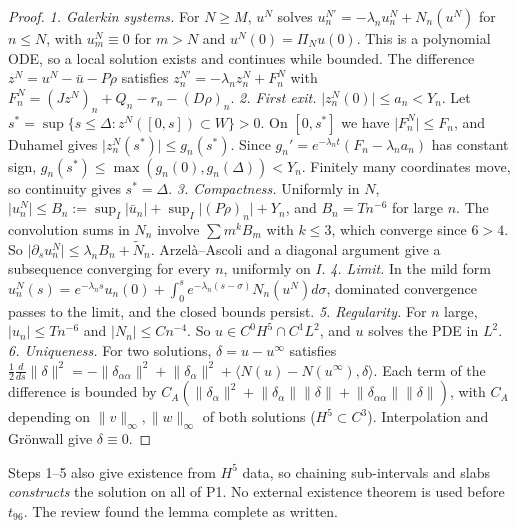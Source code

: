 \documentclass[11pt]{article}
\theoremstyle{definition}
\theoremstyle{remark}
\newcommand{\ip}[2]{\langle #1,#2\rangle}
\newcommand{\abs}[1]{\lvert #1\rvert}
\newcommand{\norm}[1]{\lVert #1\rVert}
\begin{document}
\begin{proof}
\emph{1. Galerkin systems.} For $N\ge M$, $u^N$ solves $u^{N\prime}_n=-\lambda_nu^N_n+N_n(u^N)$ for $n\le N$, with $u^N_m\equiv0$ for $m>N$ and $u^N(0)=\Pi_Nu(0)$. This is a polynomial ODE, so a local solution exists and continues while bounded. The difference $z^N=u^N-\bar u-P\rho$ satisfies $z^{N\prime}_n=-\lambda_nz^N_n+F^N_n$ with $F^N_n=(Jz^N)_n+Q_n-r_n-(D\rho)_n$.
\emph{2. First exit.} $\abs{z_n^N(0)}\le a_n<Y_n$. Let $s^*=\sup\{s\le\Delta:z^N([0,s])\subset W\}>0$. On $[0,s^*]$ we have $\abs{F_n^N}\le F_n$, and Duhamel gives $\abs{z^N_n(s^*)}\le g_n(s^*)$. Since $g_n'=e^{-\lambda_nt}(F_n-\lambda_na_n)$ has constant sign, $g_n(s^*)\le\max(g_n(0),g_n(\Delta))<Y_n$. Finitely many coordinates move, so continuity gives $s^*=\Delta$.
\emph{3. Compactness.} Uniformly in $N$, $\abs{u^N_n}\le B_n:=\sup_I\abs{\bar u_n}+\sup_I\abs{(P\rho)_n}+Y_n$, and $B_n=Tn^{-6}$ for large $n$. The convolution sums in $N_n$ involve $\sum m^kB_m$ with $k\le3$, which converge since $6>4$. So $\abs{\partial_su^N_n}\le\lambda_nB_n+\tilde N_n$. Arzel\`a--Ascoli and a diagonal argument give a subsequence converging for every $n$, uniformly on $I$.
\emph{4. Limit.} In the mild form $u_n^N(s)=e^{-\lambda_ns}u_n(0)+\int_0^se^{-\lambda_n(s-\sigma)}N_n(u^N)d\sigma$, dominated convergence passes to the limit, and the closed bounds persist.
\emph{5. Regularity.} For $n$ large, $\abs{u_n}\le Tn^{-6}$ and $\abs{N_n}\le Cn^{-4}$. So $u\in C^0H^5\cap C^1L^2$, and $u$ solves the PDE in $L^2$.
\emph{6. Uniqueness.} For two solutions, $\delta=u-u^\infty$ satisfies $\frac12\frac d{ds}\norm\delta^2=-\norm{\delta_{\alpha\alpha}}^2+\norm{\delta_\alpha}^2+\ip{N(u)-N(u^\infty)}\delta$. Each term of the difference is bounded by $C_A(\norm{\delta_\alpha}^2+\norm{\delta_\alpha}\norm\delta+\norm{\delta_{\alpha\alpha}}\norm\delta)$, with $C_A$ depending on $\norm{v}_\infty,\norm w_\infty$ of both solutions ($H^5\subset C^3$). Interpolation and Gr\"onwall give $\delta\equiv0$.
\end{proof}
\noindent Steps 1--5 also give existence from $H^5$ data, so chaining sub-intervals and slabs \emph{constructs} the solution on all of P1. No external existence theorem is used before $t_{96}$. The review found the lemma complete as written.
\end{document}
